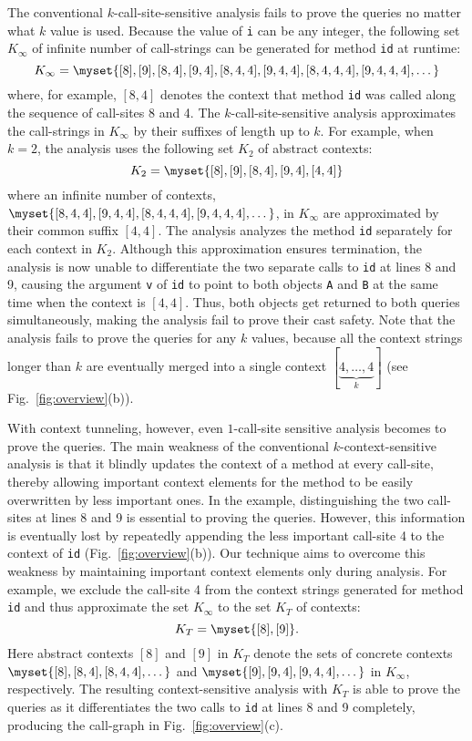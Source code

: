 The conventional $k$-call-site-sensitive analysis fails to prove the queries no matter what $k$ value is used.
Because the value of \texttt{i} can be any integer, the following set $K_{\infty}$ of infinite number of call-strings can be generated for method \texttt{id} at runtime:
\[
K_{\infty} = \myset{[8], [9], [8,4], [9,4], [8,4,4], [9,4,4], [8,4,4,4], [9,4,4,4], \dots}
\]
where, for example, $[8,4]$ denotes the context that method \texttt{id} was called along the sequence of call-sites 8 and 4. The $k$-call-site-sensitive analysis approximates the call-strings in $K_{\infty}$ by their suffixes of length up to $k$. For example, when $k=2$, the analysis uses the following set $K_2$ of abstract contexts:
\[
K_2 = \myset{[8], [9], [8,4], [9,4], [4,4]}
\]
where an infinite number of contexts, $\myset{[8,4,4], [9,4,4], [8,4,4,4], [9,4,4,4],\dots}$, in $K_{\infty}$ are approximated by their common suffix $[4,4]$. The analysis analyzes the method \texttt{id} separately for each context in $K_2$. %
Although this approximation ensures termination, the analysis is now unable to differentiate the two separate calls to \texttt{id} at lines 8 and 9, causing the argument {\tt v} of {\tt id} to point to both objects {\tt A} and {\tt B} at the same time when the context is $[4,4]$. Thus, both objects get returned to both queries simultaneously, making the analysis fail to prove their cast safety.
Note that the analysis fails to prove the queries for any $k$ values, because all the context strings longer than $k$ are eventually
merged into a single context $[\underbrace{4,\dots,4}_{k}]$ (see Fig.~\ref{fig:overview}(b)).



With context tunneling, however, even $1$-call-site sensitive analysis
becomes to prove the queries.
The main weakness of the conventional
$k$-context-sensitive analysis is that it blindly updates the context
of a method at every call-site, thereby allowing important context
elements for the method to be easily overwritten by less important
ones.  In the example, distinguishing the two call-sites
at lines 8 and 9 is essential to proving the queries. However, this
information is eventually lost by repeatedly appending the less
important call-site 4 to the context of {\tt id}
(Fig.~\ref{fig:overview}(b)).
Our technique aims to overcome this weakness by maintaining important
context elements only during analysis. For example, we exclude the
call-site 4 from the context strings generated for method {\tt id} and
thus approximate the set $K_{\infty}$ to the set $K_T$ of contexts:
\[
K_T = \myset{[8], [9]}.
\]
Here abstract contexts $[8]$ and $[9]$ in $K_{T}$ denote the sets of concrete contexts
$\myset{[8], [8,4], [8,4,4], \dots}$ and
$\myset{[9], [9,4], [9,4,4], \dots}$ in $K_{\infty}$, respectively. The resulting
context-sensitive analysis with $K_{T}$ is able to prove the queries as it differentiates the two calls
to {\tt id} at lines 8 and 9 completely, producing the call-graph in
Fig.~\ref{fig:overview}(c).

